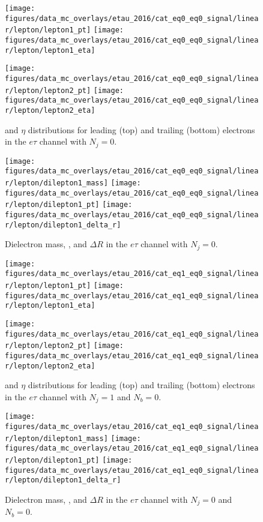 \begin{figure}[htb!]
    \centering
    \texttt{[image: figures/data\_mc\_overlays/etau\_2016/cat\_eq0\_eq0\_signal/linear/lepton/lepton1\_pt]}
    \texttt{[image: figures/data\_mc\_overlays/etau\_2016/cat\_eq0\_eq0\_signal/linear/lepton/lepton1\_eta]}

    \texttt{[image: figures/data\_mc\_overlays/etau\_2016/cat\_eq0\_eq0\_signal/linear/lepton/lepton2\_pt]}
    \texttt{[image: figures/data\_mc\_overlays/etau\_2016/cat\_eq0\_eq0\_signal/linear/lepton/lepton2\_eta]}
    \caption{\pt and $\eta$ distributions for leading (top) and trailing
    (bottom) electrons in the $e\tau$ channel with $N_{j} = 0$.}
    \label{fig:etau_1_kinematic}
\end{figure}

\begin{figure}[htb!]
    \centering
    \texttt{[image: figures/data\_mc\_overlays/etau\_2016/cat\_eq0\_eq0\_signal/linear/lepton/dilepton1\_mass]}
    \texttt{[image: figures/data\_mc\_overlays/etau\_2016/cat\_eq0\_eq0\_signal/linear/lepton/dilepton1\_pt]}
    \texttt{[image: figures/data\_mc\_overlays/etau\_2016/cat\_eq0\_eq0\_signal/linear/lepton/dilepton1\_delta\_r]}
    \caption{Dielectron mass, \pt, and $\Delta R$ in the $e\tau$ channel
    with $N_{j} = 0$.}
    \label{fig:etau_1_dilepton}
\end{figure}

\begin{figure}[htb!]
    \centering
    \texttt{[image: figures/data\_mc\_overlays/etau\_2016/cat\_eq1\_eq0\_signal/linear/lepton/lepton1\_pt]}
    \texttt{[image: figures/data\_mc\_overlays/etau\_2016/cat\_eq1\_eq0\_signal/linear/lepton/lepton1\_eta]}

    \texttt{[image: figures/data\_mc\_overlays/etau\_2016/cat\_eq1\_eq0\_signal/linear/lepton/lepton2\_pt]}
    \texttt{[image: figures/data\_mc\_overlays/etau\_2016/cat\_eq1\_eq0\_signal/linear/lepton/lepton2\_eta]}
    \caption{\pt and $\eta$ distributions for leading (top) and trailing
        (bottom) electrons in the $e\tau$ channel with $N_{j} = 1$ and
        $N_{b} = 0$.}
    \label{fig:etau_2_kinematic}
\end{figure}

\begin{figure}[htb!]
    \centering
    \texttt{[image: figures/data\_mc\_overlays/etau\_2016/cat\_eq1\_eq0\_signal/linear/lepton/dilepton1\_mass]}
    \texttt{[image: figures/data\_mc\_overlays/etau\_2016/cat\_eq1\_eq0\_signal/linear/lepton/dilepton1\_pt]}
    \texttt{[image: figures/data\_mc\_overlays/etau\_2016/cat\_eq1\_eq0\_signal/linear/lepton/dilepton1\_delta\_r]}
    \caption{Dielectron mass, \pt, and $\Delta R$ in the $e\tau$ channel
    with $N_{j} = 0$ and $N_{b} = 0$.}
    \label{fig:etau_2_dilepton}
\end{figure}

